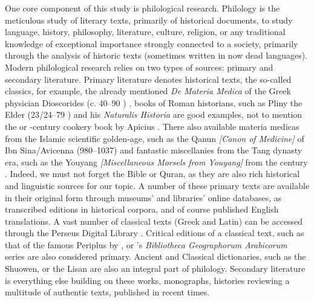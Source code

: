 One core component of this study is philological research. Philology is the meticulous study of literary texts, primarily of historical documents, to study language, history, philosophy, literature, culture, religion, or any traditional knowledge of exceptional importance strongly connected to a society, primarily through the analysis of historic texts (sometimes written in now dead languages). Modern philological research relies on two types of sources: primary and secondary literature. Primary literature denotes historical texts, the so-called classics, for example, the already mentioned \textit{De Materia Medica} of the Greek physician Dioscorides (c. 40--90 \AD) \autocite{dioscorides_materia_2005}, books of Roman historians, such as Pliny the Elder (23/24--79 \AD) and his \textit{Naturalis Historia} \autocite{pliny_the_elder_natural_1855} are good examples, not to mention the or -century cookery book by Apicius \autocite{apicius_apicius_1977}. There also available \glspl{materia medica} from the Islamic scientific golden-age, such as the \gls{Qanun} \textit{[Canon of Medicine]} of Ibn Sina/Avicenna (980--1037) \autocite{ibn_sina_-qanun_1329} and fantastic miscellanies from the Tang dynasty era, such as the \gls{Youyang} \textit{[Miscellaneous Morsels from Youyang]} from the  century \autocite{yyzz}. Indeed, we must not forget the Bible or Quran, as they are also rich historical and linguistic sources for our topic. A number of these primary texts are available in their original form through museums' and libraries' online databases, as transcribed editions in historical corpora, and of course published English translations. A vast number of classical texts (Greek and Latin) can be accessed through the Perseus Digital Library \autocite{crane_perseus_nodate}. Critical editions of a classical text, such as that of the famous \gls{Periplus} by \textcite{casson_periplus_1989}, or \textcite{de_goeje_bibliotheca_1870}'s \textit{Bibliotheca Geographorum Arabicorum} series are also considered primary. Ancient and Classical dictionaries, such as the \gls{Shuowen}, or the \gls{Lisan} are also an integral part of philology. Secondary literature is everything else building on these works, monographs, histories reviewing a multitude of authentic texts, published in recent times.





